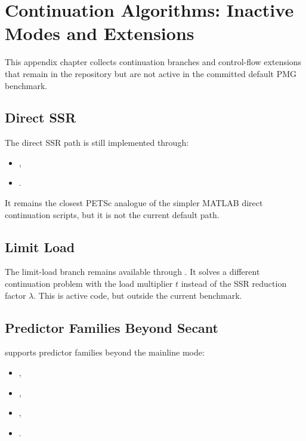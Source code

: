 \chapter{Continuation Algorithms: Inactive Modes and Extensions}
\label{app:continuation}

This appendix chapter collects continuation branches and control-flow extensions
that remain in the repository but are not active in the committed default PMG
benchmark.

\section{Direct SSR}

The direct SSR path is still implemented through:
\begin{itemize}
\item {},
\item {}.
\end{itemize}

It remains the closest PETSc analogue of the simpler MATLAB direct continuation
scripts, but it is not the current default path.

\section{Limit Load}

The limit-load branch remains available through
. It solves a different continuation
problem with the load multiplier \(t\) instead of the SSR reduction factor
\(\lambda\). This is active code, but outside the current benchmark.

\section{Predictor Families Beyond Secant}

 supports predictor families beyond the
mainline  mode:
\begin{itemize}
\item {},
\item {},
\item {},
\item {}.
\end{itemize}

